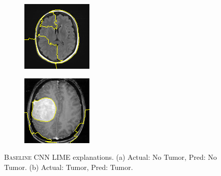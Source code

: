 \begin{figure}
\centering
\begin{subfigure}{.5\linewidth}
  \centering
    \includegraphics[width=0.9\linewidth]{figures/4__pred_0__label_0.png}
    \caption{}
    \label{fig:limenotumor}
\end{subfigure}%
\begin{subfigure}{.5\linewidth}
  \centering
    \includegraphics[width=0.9\linewidth]{figures/6__pred_1__label_1.png}
    \caption{}
    \label{fig:limetumor}
\end{subfigure}
\caption{\textsc{Baseline CNN} LIME explanations. (a) Actual: No Tumor, Pred: No Tumor. (b) Actual: Tumor, Pred: Tumor.}
\label{fig:lime}
\end{figure}


